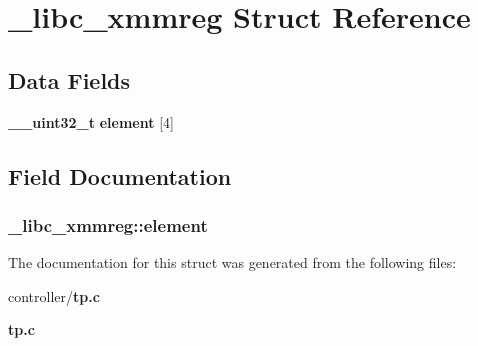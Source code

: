 \section{\_\-libc\_\-xmmreg Struct Reference}
\label{struct__libc__xmmreg}
\subsection*{Data Fields}
\begin{DoxyCompactItemize}
\item 
{\bf \_\-\_\-uint32\_\-t} {\bf element} [4]
\end{DoxyCompactItemize}


\subsection{Field Documentation}
\subsubsection[{element}]{ {\bf \_\-libc\_\-xmmreg::element}}\label{struct__libc__xmmreg_af14fe71e8eb8247bfa72a16e6b45a382}


The documentation for this struct was generated from the following files:\begin{DoxyCompactItemize}
\item 
controller/{\bf tp.c}\item 
{\bf tp.c}\end{DoxyCompactItemize}
